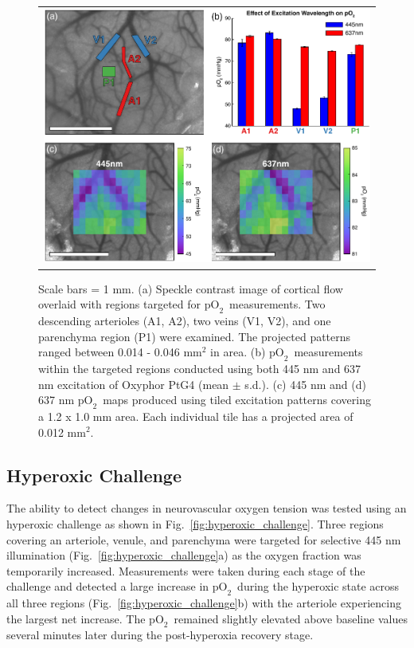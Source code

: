 \documentclass[12pt]{spieman}  %
\newcommand{\pO}{\ensuremath{\text{pO}_2}} 	            %
\begin{document}
\begin{spacing}{2}
\begin{figure}
    \begin{center}
        \begin{tabular}{c}
            \includegraphics[width=6.25in]{Figure3.pdf}
        \end{tabular}
    \end{center}
    \caption {
        \label{fig:static_oxygen}
        Scale bars = 1 mm. (a) Speckle contrast image of cortical flow overlaid with regions targeted for \pO\ measurements. Two descending arterioles (A1, A2), two veins (V1, V2), and one parenchyma region (P1) were examined. The projected patterns ranged between 0.014 - 0.046 mm$^2$ in area. (b) \pO\ measurements within the targeted regions conducted using both 445 nm and 637 nm excitation of Oxyphor PtG4 (mean $\pm$ s.d.). (c) 445 nm and (d) 637 nm \pO\ maps produced using tiled excitation patterns covering a 1.2 x 1.0 mm area. Each individual tile has a projected area of 0.012 mm$^2$.
    }
\end{figure}


\subsection{Hyperoxic Challenge}
The ability to detect changes in neurovascular oxygen tension was tested using an hyperoxic challenge as shown in Fig.~\ref{fig:hyperoxic_challenge}. Three regions covering an arteriole, venule, and parenchyma were targeted for selective 445 nm illumination (Fig.~\ref{fig:hyperoxic_challenge}a) as the oxygen fraction was temporarily increased. Measurements were taken during each stage of the challenge and detected a large increase in \pO\ during the hyperoxic state across all three regions (Fig.~\ref{fig:hyperoxic_challenge}b) with the arteriole experiencing the largest net increase. The \pO\ remained slightly elevated above baseline values several minutes later during the post-hyperoxia recovery stage.


\end{spacing}
\end{document}

